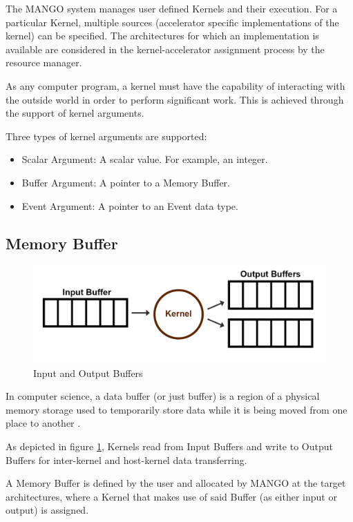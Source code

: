 The MANGO system manages user defined Kernels and their execution. For a particular Kernel, multiple sources (accelerator specific implementations of the kernel) can be specified. The architectures for which an implementation is available are considered in the kernel-accelerator assignment process by the resource manager. 

As any computer program, a kernel must have the capability of interacting with the outside world in order to perform significant work. This is achieved through the support of kernel arguments.

Three types of kernel arguments are supported: 
\begin{itemize}
    \item Scalar Argument: A scalar value. For example, an integer.
    \item Buffer Argument: A pointer to a Memory Buffer.
    \item Event Argument: A pointer to an Event data type.
\end{itemize}

\subsection{Memory Buffer}

\begin{figure}[ht]
    \centering
    \includegraphics[width=\textwidth]{img/kernel-buffer.png}
    \captionsetup{justification=centering}
    \caption{Input and Output Buffers}
    \label{fig:in_out_buffers}
\end{figure}

In computer science, a data buffer (or just buffer) is a region of a physical memory storage used to temporarily store data while it is being moved from one place to another \cite{buffer_wikipedia}.

As depicted in figure \ref{fig:in_out_buffers}, Kernels read from Input Buffers and write to Output Buffers for inter-kernel and host-kernel data transferring.

A Memory Buffer is defined by the user and allocated by MANGO at the target architectures, where a Kernel that makes use of said Buffer (as either input or output) is assigned.

